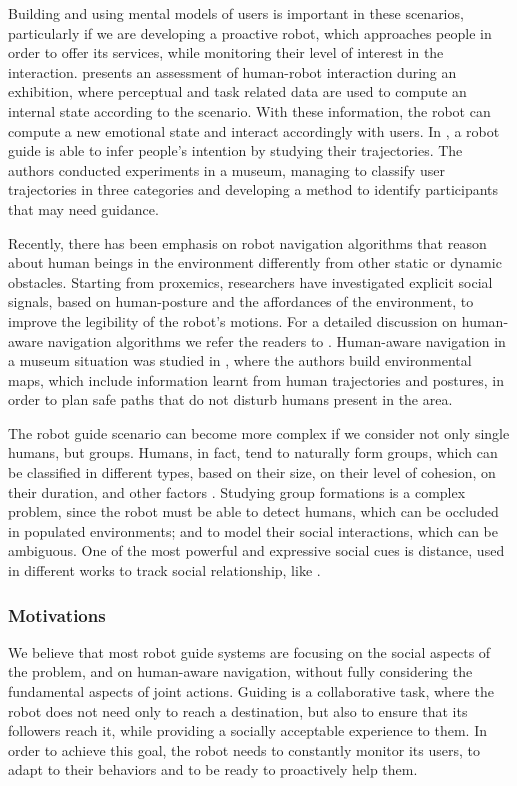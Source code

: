 Building and using mental models of users is important in these scenarios, particularly if we are developing a proactive robot, which approaches people in order to offer its services, while monitoring their level of interest in the interaction. \cite{Jensen2005} presents an assessment of human-robot interaction during an exhibition, where perceptual and task related data are used to compute an internal state according to the scenario. With these information, the robot can compute a new emotional state and interact accordingly with users.
In \cite{rashed2015toward}, a robot guide is able to infer people's intention by studying their trajectories. The authors conducted experiments in a museum, managing to classify user trajectories in three categories and developing a method to identify participants that may need guidance. 

Recently, there has been emphasis on robot navigation algorithms that reason about human beings in the environment differently from other static or dynamic obstacles. Starting from proxemics, researchers have investigated explicit social signals, based on human-posture and the affordances of the environment, to improve the legibility of the robot's motions. For a detailed discussion on human-aware navigation algorithms we refer the readers to \cite{kruse2013human,rios-ijsr-2014}. Human-aware navigation in a museum situation was studied in \cite{samejima2015building}, where the authors build environmental maps, which include information learnt from human trajectories and postures, in order to plan safe paths that do not disturb humans present in the area. 

The robot guide scenario can become more complex if we consider not only single humans, but groups. Humans, in fact, tend to naturally form groups, which can be classified in different types, based on their size, on their level of cohesion, on their duration, and other factors \cite{forsyth2009group}.  Studying group formations is a complex problem, since the robot must be able to detect humans, which can be occluded in populated environments; and to model their social interactions, which can be ambiguous. One of the most powerful and expressive social cues is distance, used in different works to track social relationship, like \cite{luber2013multi}. 

\subsubsection{Motivations}
We believe that most robot guide systems are focusing on the social aspects of the problem, and on human-aware navigation, without fully considering the fundamental aspects of joint actions. Guiding is a collaborative task, where the robot does not need only to reach a destination, but also to ensure that its followers reach it, while providing a socially acceptable experience to them. In order to achieve this goal, the robot needs to constantly monitor its users, to adapt to their behaviors and to be ready to proactively help them.

